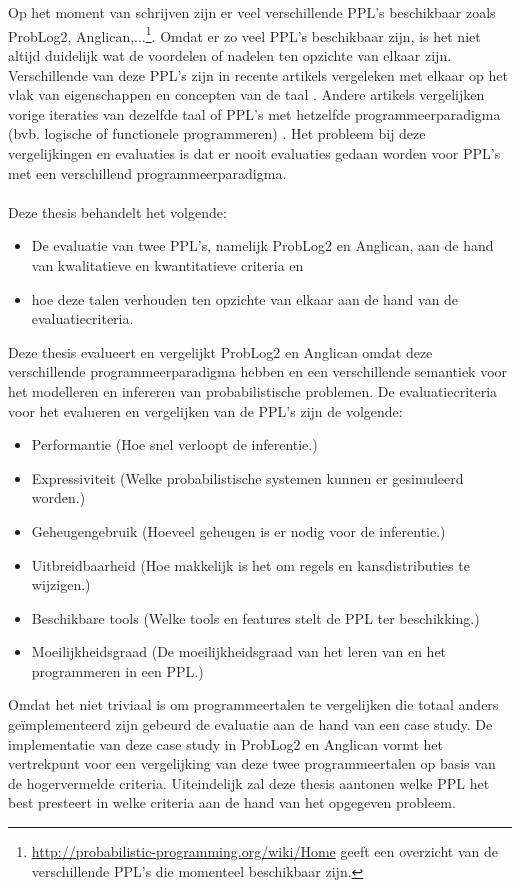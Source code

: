 \documentclass[12pt,a4paper,oneside]{book}
\theoremstyle{definition}
\begin{document}
\\\\
Op het moment van schrijven zijn er veel verschillende PPL's beschikbaar zoals ProbLog2, Anglican,...\footnote{\url{http://probabilistic-programming.org/wiki/Home} geeft een overzicht van de verschillende PPL's die momenteel beschikbaar zijn.}.
Omdat er zo veel PPL's beschikbaar zijn, is het niet altijd duidelijk wat de voordelen of nadelen ten opzichte van elkaar zijn. Verschillende van deze PPL's zijn in recente artikels vergeleken met elkaar op het vlak van eigenschappen en concepten van de taal \cite{plpconcepts}. Andere artikels vergelijken vorige iteraties van dezelfde taal of PPL's met hetzelfde programmeerparadigma (bvb. logische of functionele programmeren) \cite{plpinferencelearningwbf}. Het probleem bij deze vergelijkingen en evaluaties is dat er nooit evaluaties gedaan worden voor PPL's met een verschillend programmeerparadigma.
\\\\
Deze thesis behandelt het volgende:
\begin{itemize}
	\item De evaluatie van twee PPL's, namelijk ProbLog2 en Anglican, aan de hand van kwalitatieve en kwantitatieve criteria en
	\item hoe deze talen verhouden ten opzichte van elkaar aan de hand van de evaluatiecriteria.
\end{itemize}
Deze thesis evalueert en vergelijkt ProbLog2 en Anglican omdat deze verschillende programmeerparadigma hebben en een verschillende semantiek voor het modelleren en infereren van probabilistische problemen. De evaluatiecriteria voor het evalueren en vergelijken van de PPL's zijn de volgende:
\begin{itemize}
	\item Performantie (Hoe snel verloopt de inferentie.)
	\item Expressiviteit (Welke probabilistische systemen kunnen er gesimuleerd worden.)
	\item Geheugengebruik (Hoeveel geheugen is er nodig voor de inferentie.)
	\item Uitbreidbaarheid (Hoe makkelijk is het om regels en kansdistributies te wijzigen.)
	\item Beschikbare tools (Welke tools en features stelt de PPL ter beschikking.)
	\item Moeilijkheidsgraad (De moeilijkheidsgraad van het leren van en het programmeren in een PPL.)
\end{itemize}
Omdat het niet triviaal is om programmeertalen te vergelijken die totaal anders ge\"{i}mplementeerd zijn gebeurd de evaluatie aan de hand van een case study. De implementatie van deze case study in ProbLog2 en Anglican vormt het vertrekpunt voor een vergelijking van deze twee programmeertalen op basis van de hogervermelde criteria. Uiteindelijk zal deze thesis aantonen welke PPL het best presteert in welke criteria aan de hand van het opgegeven probleem.
\end{document}
